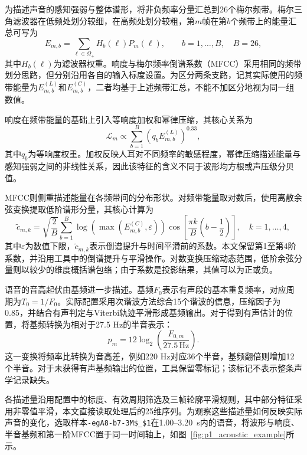 为描述声音的感知强弱与整体谱形，将非负频率分量汇总到26个梅尔频带。梅尔三角滤波器在低频处划分较细，在高频处划分较粗，第$m$帧在第$b$个频带上的能量汇总可写为
\begin{equation}
    E_{m,b}=\sum_{\ell\in\Omega_+}H_b(\ell)P_m(\ell),
    \qquad b=1,\ldots,B,\quad B=26,
    \label{eq:p1_mel_energy}
\end{equation}
其中$H_b(\ell)$为滤波器权重。响度与梅尔频率倒谱系数（MFCC）采用相同的频带划分思路，但分别沿用各自的输入标度设置。为区分两条支路，记其实际使用的频带能量为$E^{(L)}_{m,b}$和$E^{(C)}_{m,b}$，二者均基于上述频带汇总，不能不加区分地视为同一组数值。

响度在频带能量的基础上引入等响度加权和幂律压缩，其核心关系为
\begin{equation}
    \mathcal{L}_m\propto\sum_{b=1}^{B}
    \left(q_bE^{(L)}_{m,b}\right)^{0.33},
    \label{eq:p1_loudness}
\end{equation}
其中$q_b$为等响度权重。加权反映人耳对不同频率的敏感程度，幂律压缩描述能量与感知强弱之间的非线性关系，因此该特征的含义不同于波形均方根或声压级分贝值。

MFCC则侧重描述能量在各频带间的分布形状。对频带能量取对数后，使用离散余弦变换提取低阶谱形分量，其核心计算为
\begin{equation}
    \widetilde c_{m,k}=\sqrt{\frac{2}{B}}
    \sum_{b=1}^{B}\log\!\left(\max\!\left(E^{(C)}_{m,b},\varepsilon\right)\right)
    \cos\!\left[\frac{\pi k}{B}\left(b-\frac12\right)\right],
    \quad k=1,\ldots,4,
    \label{eq:p1_mfcc}
\end{equation}
其中$\varepsilon$为数值下限，$\widetilde c_{m,k}$表示倒谱提升与时间平滑前的系数。本文保留第1至第4阶系数，并沿用工具中的倒谱提升与平滑操作。对数变换压缩动态范围，低阶余弦分量则以较少的维度概括谱包络；由于系数是投影结果，其值可以为正或负。

语音的音高起伏由基频进一步描述。基频$F_0$表示有声段的基本重复频率，对应周期为$T_0=1/F_0$。实际配置采用次谐波方法综合15个谐波的信息，压缩因子为0.85，并结合有声判定与Viterbi轨迹平滑形成基频输出。对于得到有声估计的位置，将基频转换为相对于27.5 Hz的半音表示：
\begin{equation}
    p_m=12\log_2\!\left(\frac{F_{0,m}}{27.5\,\mathrm{Hz}}\right).
    \label{eq:p1_pitch_semitone}
\end{equation}
这一变换将频率比转换为音高差，例如220 Hz对应36个半音，基频翻倍则增加12个半音。对于未获得有声基频输出的位置，工具保留零标记；该标记不表示整条声学记录缺失。

各描述量沿用配置中的标度、有效周期筛选及三帧轮廓平滑规则，其中部分特征采用非零值平滑，本文直接读取处理后的25维序列。为观察这些描述量如何反映实际声音的变化，选取样本\texttt{-egA8-b7-3M\$\_\$1}在1.00--3.20~s内的语音，将波形与响度、半音基频和第一阶MFCC置于同一时间轴上，如图~\ref{fig:p1_acoustic_example}所示。

